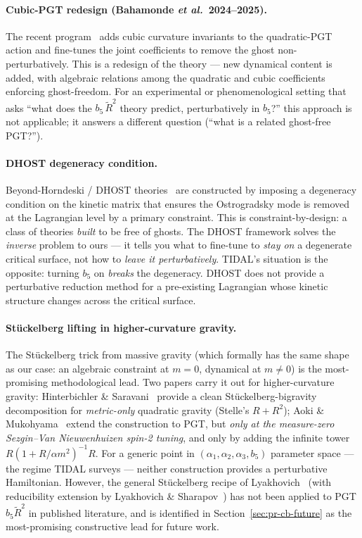 \paragraph{Cubic-PGT redesign (Bahamonde \emph{et al.}~2024--2025).}
The recent program~\cite{bahamonde2025cubic,bahamonde2025torsion}
adds cubic curvature invariants to the quadratic-PGT action and
fine-tunes the joint coefficients to remove the ghost
non-perturbatively.  This is a redesign of the theory --- new dynamical
content is added, with algebraic relations among the quadratic and
cubic coefficients enforcing ghost-freedom.  For an experimental or
phenomenological setting that asks ``what does the $b_5\,\tilde{R}^2$
theory predict, perturbatively in $b_5$?'' this approach is not
applicable; it answers a different question (``what is a related
ghost-free PGT?'').

\paragraph{DHOST degeneracy condition.}
Beyond-Horndeski / DHOST theories~\cite{Langlois2018} are constructed by
imposing a degeneracy condition on the kinetic matrix that ensures the
Ostrogradsky mode is removed at the Lagrangian level by a primary
constraint.  This is constraint-by-design: a class of theories \emph{built}
to be free of ghosts.  The DHOST framework solves the
\emph{inverse} problem to ours --- it tells you what to fine-tune to
\emph{stay on} a degenerate critical surface, not how to \emph{leave it
perturbatively}.  TIDAL's situation is the opposite: turning $b_5$ on
\emph{breaks} the degeneracy.  DHOST does not provide a perturbative
reduction method for a pre-existing Lagrangian whose kinetic structure
changes across the critical surface.

\paragraph{Stückelberg lifting in higher-curvature gravity.}
The Stückelberg trick from massive gravity (which formally has the same
shape as our case: an algebraic constraint at $m = 0$, dynamical at
$m \ne 0$) is the most-promising methodological lead.  Two papers carry
it out for higher-curvature gravity:
Hinterbichler \& Saravani~\cite{HinterbichlerSaravani2015} provide a
clean Stückelberg-bigravity decomposition for \emph{metric-only}
quadratic gravity (Stelle's $R + R^2$);
Aoki \& Mukohyama~\cite{aoki2020ghostfree} extend the construction to
PGT, but \emph{only at the measure-zero Sezgin--Van Nieuwenhuizen spin-2
tuning}, and only by adding the infinite tower
$R(1 + R/\alpha m^2)^{-1}R$.  For a generic point in
$(\alpha_1, \alpha_2, \alpha_3, b_5)$ parameter space --- the regime
TIDAL surveys --- neither construction provides a perturbative
Hamiltonian.  However, the general Stückelberg recipe of
Lyakhovich~\cite{Lyakhovich2021} (with reducibility extension by
Lyakhovich \& Sharapov~\cite{LyakhovichSharapov2021}) has not been
applied to PGT $b_5 \tilde{R}^2$ in published literature, and is
identified in Section~\ref{sec:pr-cb-future} as the most-promising
constructive lead for future work.

